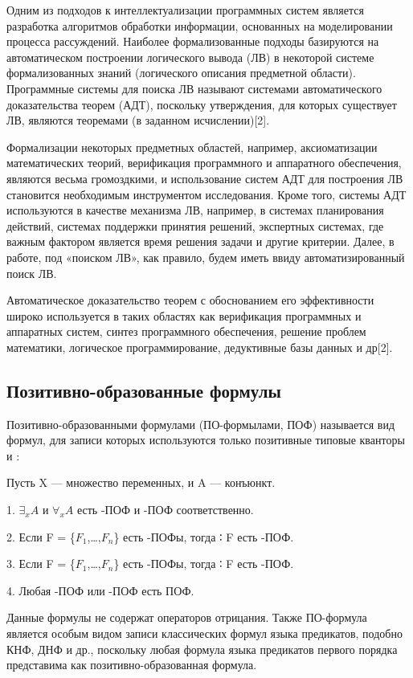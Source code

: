 Одним из подходов к интеллектуализации программных систем является разработка алгоритмов обработки информации, основанных на моделировании процесса рассуждений. Наиболее формализованные подходы базируются на автоматическом построении логического вывода (ЛВ) в некоторой системе формализованных знаний (логического описания предметной области). Программные системы для поиска ЛВ называют системами автоматического доказательства теорем (АДТ), поскольку утверждения, для которых существует ЛВ, являются теоремами (в заданном исчислении)[2].

Формализации некоторых предметных областей, например, аксиоматизации математических теорий, верификация программного и аппаратного обеспечения, являются весьма громоздкими, и использование систем АДТ для построения ЛВ становится необходимым инструментом исследования. Кроме того, системы АДТ используются в качестве механизма ЛВ, например, в системах планирования действий, системах поддержки принятия решений, экспертных системах, где важным фактором является время решения задачи и другие критерии. Далее, в работе, под «поиском ЛВ», как правило, будем иметь ввиду автоматизированный поиск ЛВ.

Автоматическое доказательство теорем с обоснованием его эффективности широко используется в таких областях как верификация программных и аппаратных систем, синтез программного обеспечения, решение проблем математики, логическое программирование, дедуктивные базы данных и др[2].

\subsection{Позитивно-образованные формулы}

Позитивно-образованными формулами (ПО-формылами, ПОФ) называется вид формул, для записи которых используются только позитивные типовые кванторы \forall{}  и \exists:

Пусть X — множество переменных, и A — конъюнкт.

1. $\exists_x A$ и $\forall_x A$ есть \exists-ПОФ и \forall-ПОФ соответственно.

2. Если F = \{$F_1$,…,$F_n$\} есть \forall-ПОФы, тогда  ∶ F есть \exists-ПОФ.

3. Если F = \{$F_1$,…,$F_n$\} есть \exists-ПОФы, тогда  ∶ F есть \forall-ПОФ.

4. Любая \exists-ПОФ или \forall-ПОФ есть ПОФ.

Данные формулы не содержат операторов отрицания. Также ПО-формула является особым видом записи классических формул языка предикатов, подобно КНФ, ДНФ и др., поскольку любая формула языка предикатов первого порядка представима как позитивно-образованная формула.


